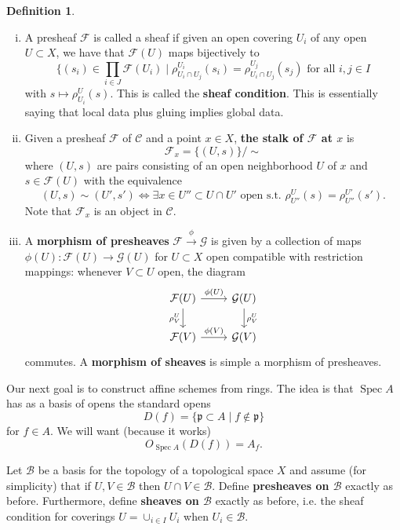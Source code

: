 \documentclass{article}
\newcommand{\fr}{\mathfrak}
\DeclareMathOperator{\Spec}{Spec}
\theoremstyle{plain}
\theoremstyle{definition}
\newtheorem{defn}{Definition}
\theoremstyle{remark}
\begin{document}
\begin{defn}
\begin{enumerate}[(i)]
\item A presheaf $\mathcal{F}$ is called a sheaf if given an open covering $U_i$ of any open $U\subset X$, we have that $\mathcal{F}(U)$ maps bijectively to \[\{(s_i)\in\prod_{i\in J}\mathcal{F}(U_i)\mid \rho^{U_i}_{U_i\cap U_j}(s_i)=\rho^{U_j}_{U_i\cap U_j}(s_j)\text{ for all }i,j\in I\]
with $s\mapsto \rho_{U_i}^U(s)$.
This is called the \textbf{sheaf condition}. This is essentially saying that local data plus gluing implies global data.
\item Given a presheaf $\mathcal{F}$ of $\mathcal{C}$ and a point $x\in X$, \textbf{the stalk of $\mathcal{F}$ at $x$} is
\[\mathcal{F}_x=\{(U,s)\}/\sim\]
where $(U,s)$ are pairs consisting of an open neighborhood $U$ of $x$ and $s\in\mathcal{F}(U)$ with the equivalence
\[(U,s)\sim(U',s')\Leftrightarrow \exists x\in U''\subset U\cap U' \text{ open s.t. } \rho_{U''}^U(s)=\rho_{U''}^{U'}(s'). \]
Note that $\mathcal{F}_x$ is an object in $\mathcal{C}$.
\item A \textbf{morphism of presheaves} $\mathcal{F}\overset{\phi}{\to}\mathcal{G}$ is given by a collection of maps $\phi(U):\mathcal{F}(U)\to\mathcal{G}(U)$ for $U\subset X$ open compatible with restriction mappings: whenever $V\subset U$ open, the diagram
\begin{equation*}
\begin{tikzcd}
\mathcal{F}(U)\arrow{r}{\phi(U)}\arrow[swap]{d}{\rho_V^U} &\mathcal{G}(U)\arrow{d}{\rho_V^U}\\
\mathcal{F}(V)\arrow{r}{\phi(V)} & \mathcal{G}(V)
\end{tikzcd}
\end{equation*}
commutes. A \textbf{morphism of sheaves} is simple a morphism of presheaves.
\end{enumerate}
\end{defn}

Our next goal is to construct affine schemes from rings. The idea is that $\Spec A$ has as a basis of opens the standard opens
\[D(f)=\{\fr p\subset A\mid f\notin\fr p\}\]
for $f\in A$. We will want (because it works)
\[O_{\Spec A}(D(f))=A_f.\]

Let $\mathcal{B}$ be a basis for the topology of a topological space $X$ and assume (for simplicity) that if $U,V\in\mathcal{B}$ then $U\cap V\in\mathcal{B}$. Define \textbf{presheaves on $\mathcal{B}$} exactly as before. Furthermore, define \textbf{sheaves on $\mathcal{B}$} exactly as before, i.e. the sheaf condition for coverings $U=\cup_{i\in I}U_i$ when $U_i\in\mathcal{B}$.
\end{document}
